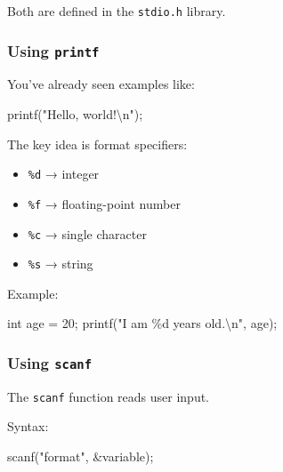 \documentclass[
  letterpaper,
  DIV=11,
  numbers=noendperiod]{scrreprt}
\newenvironment{Shaded}{\begin{snugshade}}{\end{snugshade}}
\newcommand{\DataTypeTok}[1]{\textcolor[rgb]{0.68,0.00,0.00}{#1}}
\newcommand{\DecValTok}[1]{\textcolor[rgb]{0.68,0.00,0.00}{#1}}
\newcommand{\NormalTok}[1]{\textcolor[rgb]{0.00,0.23,0.31}{#1}}
\newcommand{\OperatorTok}[1]{\textcolor[rgb]{0.37,0.37,0.37}{#1}}
\newcommand{\SpecialCharTok}[1]{\textcolor[rgb]{0.37,0.37,0.37}{#1}}
\newcommand{\StringTok}[1]{\textcolor[rgb]{0.13,0.47,0.30}{#1}}
\providecommand{\tightlist}{%
  \setlength{\itemsep}{0pt}\setlength{\parskip}{0pt}}
\begin{document}
Both are defined in the \texttt{stdio.h} library.

\subsubsection{\texorpdfstring{Using
\texttt{printf}}{Using printf}}\label{using-printf}

You've already seen examples like:

\begin{Shaded}
\begin{Highlighting}[]
\NormalTok{printf}\OperatorTok{(}\StringTok{"Hello, world!}\SpecialCharTok{\textbackslash{}n}\StringTok{"}\OperatorTok{);}
\end{Highlighting}
\end{Shaded}

The key idea is format specifiers:

\begin{itemize}
\tightlist
\item
  \texttt{\%d} → integer
\item
  \texttt{\%f} → floating-point number
\item
  \texttt{\%c} → single character
\item
  \texttt{\%s} → string
\end{itemize}

Example:

\begin{Shaded}
\begin{Highlighting}[]
\DataTypeTok{int}\NormalTok{ age }\OperatorTok{=} \DecValTok{20}\OperatorTok{;}
\NormalTok{printf}\OperatorTok{(}\StringTok{"I am }\SpecialCharTok{\%d}\StringTok{ years old.}\SpecialCharTok{\textbackslash{}n}\StringTok{"}\OperatorTok{,}\NormalTok{ age}\OperatorTok{);}
\end{Highlighting}
\end{Shaded}

\subsubsection{\texorpdfstring{Using
\texttt{scanf}}{Using scanf}}\label{using-scanf}

The \texttt{scanf} function reads user input.

Syntax:

\begin{Shaded}
\begin{Highlighting}[]
\NormalTok{scanf}\OperatorTok{(}\StringTok{"format"}\OperatorTok{,} \OperatorTok{\&}\NormalTok{variable}\OperatorTok{);}
\end{Highlighting}
\end{Shaded}
\end{document}
